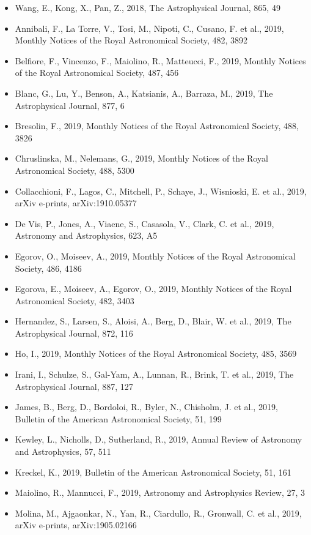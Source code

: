 \documentclass{letter}
\begin{document}
\begin{enumerate}
\begin{itemize}
\item Wang, E., Kong, X., Pan, Z., 2018, The Astrophysical Journal, 865, 49
\item Annibali, F., La Torre, V., Tosi, M., Nipoti, C., Cusano, F. et al., 2019, Monthly Notices of the Royal Astronomical Society, 482, 3892
\item Belfiore, F., Vincenzo, F., Maiolino, R., Matteucci, F., 2019, Monthly Notices of the Royal Astronomical Society, 487, 456
\item Blanc, G., Lu, Y., Benson, A., Katsianis, A., Barraza, M., 2019, The Astrophysical Journal, 877, 6
\item Bresolin, F., 2019, Monthly Notices of the Royal Astronomical Society, 488, 3826
\item Chruslinska, M., Nelemans, G., 2019, Monthly Notices of the Royal Astronomical Society, 488, 5300
\item Collacchioni, F., Lagos, C., Mitchell, P., Schaye, J., Wisnioski, E. et al., 2019, arXiv e-prints, arXiv:1910.05377
\item De Vis, P., Jones, A., Viaene, S., Casasola, V., Clark, C. et al., 2019, Astronomy and Astrophysics, 623, A5
\item Egorov, O., Moiseev, A., 2019, Monthly Notices of the Royal Astronomical Society, 486, 4186
\item Egorova, E., Moiseev, A., Egorov, O., 2019, Monthly Notices of the Royal Astronomical Society, 482, 3403
\item Hernandez, S., Larsen, S., Aloisi, A., Berg, D., Blair, W. et al., 2019, The Astrophysical Journal, 872, 116
\item Ho, I., 2019, Monthly Notices of the Royal Astronomical Society, 485, 3569
\item Irani, I., Schulze, S., Gal-Yam, A., Lunnan, R., Brink, T. et al., 2019, The Astrophysical Journal, 887, 127
\item James, B., Berg, D., Bordoloi, R., Byler, N., Chisholm, J. et al., 2019, Bulletin of the American Astronomical Society, 51, 199
\item Kewley, L., Nicholls, D., Sutherland, R., 2019, Annual Review of Astronomy and Astrophysics, 57, 511
\item Kreckel, K., 2019, Bulletin of the American Astronomical Society, 51, 161
\item Maiolino, R., Mannucci, F., 2019, Astronomy and Astrophysics Review, 27, 3
\item Molina, M., Ajgaonkar, N., Yan, R., Ciardullo, R., Gronwall, C. et al., 2019, arXiv e-prints, arXiv:1905.02166

\end{itemize}
\end{enumerate}
\end{document}
